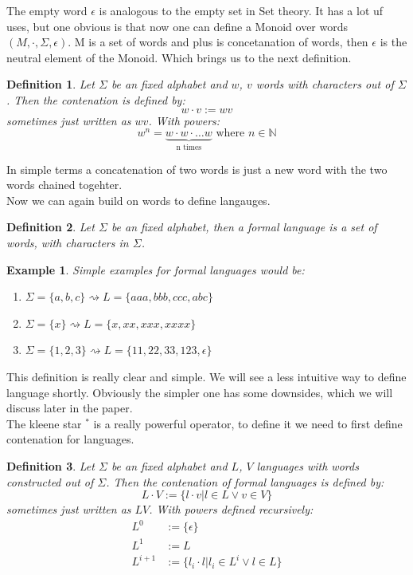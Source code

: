 \documentclass[12pt,letterpaper]{article}
\newtheorem{definition}{Definition}
\newtheorem{example}{Example}[section]
\begin{document}
The empty word $\epsilon$ is analogous to the empty set in Set theory.
It has a lot uf uses, but one obvious is that now one can define 
a Monoid over words $(M, \cdot, \Sigma, \epsilon)$.
M is a set of words and plus is concetanation of words, then 
$\epsilon$ is the neutral element of the Monoid. Which brings us to
the next definition.
\begin{definition}
  Let $\Sigma$ be an fixed alphabet and  $w$, $v$ words with 
  characters out of $\Sigma$. Then the contenation is defined by:
  \[ w \cdot v := wv\]
  sometimes just written as $wv$. With powers:
  \[ 
    w^n = \underbrace{w\cdot w \cdot \dots w}_{\text{n times}}
    \text{ where } n \in \mathbb{N}
  \]
\end{definition}
In simple terms a concatenation of two words is just a new word with 
the two words chained togehter.\\
Now we can again build on words to define langauges.
\begin{definition}
  Let $\Sigma$ be an fixed alphabet, then a formal language is a 
  set of words, with characters in $\Sigma$.
\end{definition}
\begin{example}
  Simple examples for formal languages would be:
  \begin{enumerate}
    \item $\Sigma = \{a,b,c\} \rightsquigarrow L = \{aaa, bbb, ccc, abc\}$
    \item $\Sigma = \{x\} \rightsquigarrow L = \{ x, xx, xxx, xxxx\}$
    \item $\Sigma = \{1,2,3\} \rightsquigarrow L = \{11, 22, 33, 123,\epsilon\}$
  \end{enumerate}
\end{example}
This definition is really clear and simple. We will see a less intuitive way to
define language shortly. Obviously the simpler one has some downsides, 
which we will discuss later in the paper. \\
The kleene star $^*$ is a really powerful operator, to define it we need
to first define contenation for languages.
\begin{definition}
  Let $\Sigma$ be an fixed alphabet and  $L$, $V$ languages with 
  words constructed out of $\Sigma$.
  Then the contenation of formal languages is defined by:
  \[ L \cdot V := \{ l \cdot v | l \in L \lor v \in V \}\]
  sometimes just written as $LV$. With powers defined recursively:
  \begin{align*}
      L^0 & := \{\epsilon \}\\
      L^1 & := L  \\
      L^{i+1} & := \{ l_i\cdot l | l_i \in L^i \lor l \in L\}
  \end{align*}
\end{definition}
\end{document}
